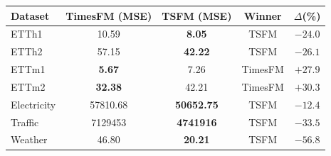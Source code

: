 \begin{tabular}{lcccc}
\toprule
Dataset & TimesFM (MSE) & TSFM (MSE) & Winner & $\Delta$(\%) \\
\midrule
ETTh1       & 10.59          & \textbf{8.05}           & TSFM    & $-24.0$ \\
ETTh2       & 57.15          & \textbf{42.22}          & TSFM    & $-26.1$ \\
ETTm1       & \textbf{5.67}  & 7.26                    & TimesFM & $+27.9$ \\
ETTm2       & \textbf{32.38} & 42.21                   & TimesFM & $+30.3$ \\
Electricity & 57810.68       & \textbf{50652.75}       & TSFM    & $-12.4$ \\
Traffic     & 7129453        & \textbf{4741916}        & TSFM    & $-33.5$ \\
Weather     & 46.80          & \textbf{20.21}          & TSFM    & $-56.8$ \\
\bottomrule
\end{tabular}
